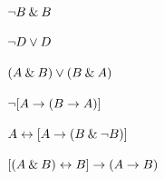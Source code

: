\begin{earg}
\item ${\neg} B \mathbin{\&} B$ \vspace{.5ex}%
\item ${\neg} D \vee D$ \vspace{.5ex}%
\item $(A\mathbin{\&} B) \vee (B\mathbin{\&} A)$\vspace{.5ex} %
\item ${\neg}[A \rightarrow (B \rightarrow A)]$\vspace{.5ex} %
\item $A \leftrightarrow [A \rightarrow (B \mathbin{\&} {\neg} B)]$ \vspace{.5ex}%
\item $[(A \mathbin{\&} B) \leftrightarrow B] \rightarrow (A \rightarrow B)$ \vspace{.5ex}%
\end{earg}


